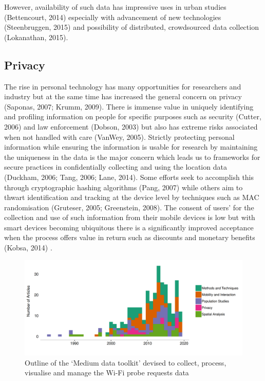 However, availability of such data has impressive uses in urban studies (Bettencourt, 2014) especially with advancement of new technologies (Steenbruggen, 2015) and possibility of distributed, crowdsourced data collection (Lokanathan, 2015).


\subsection{Privacy}

The rise in personal technology has many opportunities for researchers and industry but at the same time has increased the general concern on privacy (Saponas, 2007; Krumm, 2009).
There is immense value in uniquely identifying and profiling information on people for specific purposes such as security (Cutter, 2006) and law enforcement (Dobson, 2003) but also has extreme risks associated when not handled with care (VanWey, 2005).
Strictly protecting personal information while ensuring the information is usable for research by maintaining the uniqueness in the data is the major concern which leads us to frameworks for secure practices in confidentially collecting and using the location data (Duckham, 2006; Tang, 2006; Lane, 2014).
Some efforts seek to accomplish this through cryptographic hashing algorithms (Pang, 2007) while others aim to thwart identification and tracking at the device level by techniques such as MAC randomisation (Gruteser, 2005; Greenstein, 2008).
The consent of users’ for the collection and use of such information from their mobile devices is low but with smart devices becoming ubiquitous there is a significantly improved acceptance when the process offers value in return such as discounts and monetary benefits (Kobsa, 2014) .


\begin{figure}
  \includegraphics{images/literature-themes-timeline.png}
  \caption{Outline of the `Medium data toolkit' devised to collect, process, visualise and manage the Wi-Fi probe requests data}
  \label{figure:literature:themes:timeline}
\end{figure}

